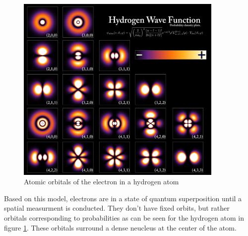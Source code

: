 \begin{figure}[H]
  \centering
  \includegraphics[width=100mm]{figures/electronCloud.png}
  \caption{Atomic orbitals of the electron in a hydrogen atom}
  \label{electronCloud}
\end{figure}

Based on this model, electrons are in a state of quantum superposition until a spatial measurment is conducted.
They don't have fixed orbits, but rather orbitals corresponding to probabilities as can be seen for the hydrogen atom in figure \ref{electronCloud}.
These orbitals surround a dense neucleus at the center of the atom.
